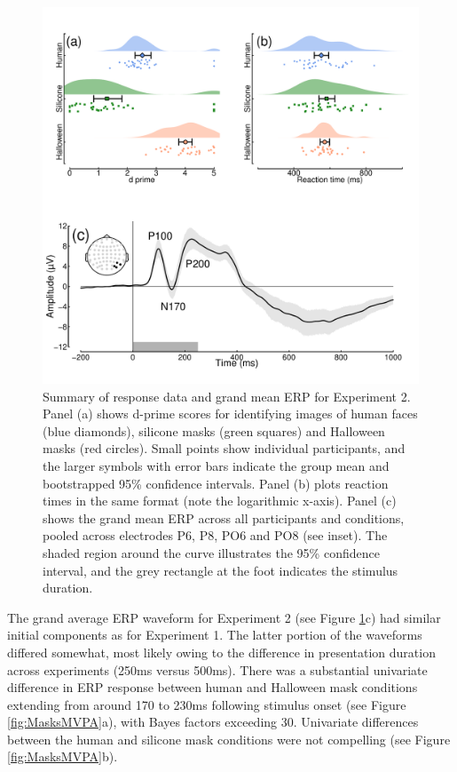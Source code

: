 \documentclass[
]{article}
\begin{document}
\begin{figure}

{\centering \includegraphics{Figures/MasksData} 

}

\caption{Summary of response data and grand mean ERP for Experiment 2. Panel (a) shows d-prime scores for identifying images of human faces (blue diamonds), silicone masks (green squares) and Halloween masks (red circles). Small points show individual participants, and the larger symbols with error bars indicate the group mean and bootstrapped 95\% confidence intervals. Panel (b) plots reaction times in the same format (note the logarithmic x-axis). Panel (c) shows the grand mean ERP across all participants and conditions, pooled across electrodes P6, P8, PO6 and PO8 (see inset). The shaded region around the curve illustrates the 95\% confidence interval, and the grey rectangle at the foot indicates the stimulus duration.}\label{fig:MasksData}
\end{figure}

The grand average ERP waveform for Experiment 2 (see Figure \ref{fig:MasksData}c) had similar initial components as for Experiment 1. The latter portion of the waveforms differed somewhat, most likely owing to the difference in presentation duration across experiments (250ms versus 500ms). There was a substantial univariate difference in ERP response between human and Halloween mask conditions extending from around 170 to 230ms following stimulus onset (see Figure \ref{fig:MasksMVPA}a), with Bayes factors exceeding 30. Univariate differences between the human and silicone mask conditions were not compelling (see Figure \ref{fig:MasksMVPA}b).
\end{document}
